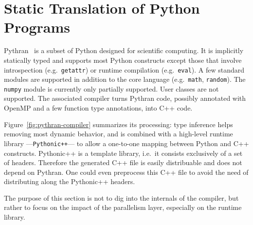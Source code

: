 \documentclass[conference]{IEEEtran}
\begin{document}
\section{Static Translation of Python Programs}\label{sec:python-static}

Pythran~\cite{pythran2013} is a subset of Python designed for scientific
computing. It is implicitly statically typed and supports most Python constructs
except those that involve introspection (e.g.\ \texttt{getattr}) or runtime
compilation (e.g.\ \texttt{eval}). A few standard modules are supported in
addition to the core language (e.g.\ \texttt{math}, \texttt{random}). The
\texttt{numpy} module is currently only partially supported. User classes are
not supported. The associated compiler turns Pythran code, possibly annotated
with OpenMP and a few function type annotations, into C++ code.

Figure~\ref{fig:pythran-compiler} summarizes its processing: type inference
helps removing most dynamic behavior, and is combined with a high-level runtime
library ---\texttt{Pythonic++}--- to allow a one-to-one mapping between Python
and C++ constructs. Pythonic++ is a template library, i.e.\ it consists
exclusively of a set of headers. Therefore the generated C++ file is easily
distribuable and does not depend on Pythran. One could even preprocess this
C++ file to avoid the need of distributing along the Pythonic++ headers.

The purpose of this section is not to dig into the internals
of the compiler, but rather to focus on the impact of the parallelism layer,
especially on the runtime library.
\end{document}
